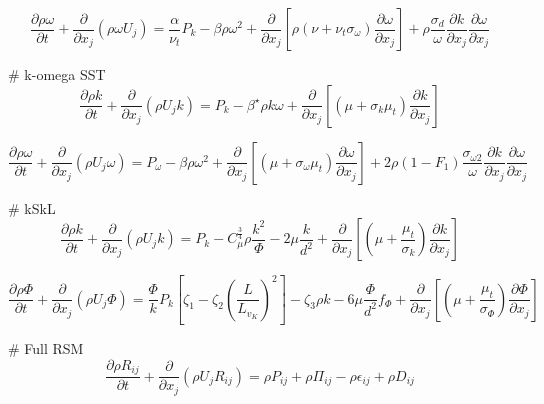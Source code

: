 \begin{equation}
\frac{\partial \rho \omega}{\partial t} + \frac{\partial}{\partial x_j} \left(\rho \omega U_j \right) = \frac{\alpha}{\nu_t}P_k - \beta\rho\omega^2 + \frac{\partial }{\partial x_j}  \left[  \rho\left( \nu + \nu_t\sigma_\omega \right) \frac{\partial \omega}{\partial x_j} \right]  + \rho\frac{\sigma_{d}}{\omega} \frac{\partial k}{\partial x_j}\frac{\partial \omega}{\partial x_j}
\end{equation}

# k-omega SST
\begin{equation}
\frac{\partial \rho k}{\partial t} + \frac{\partial}{\partial x_{j}}\left(\rho U_{j}k \right) = P_{k}-\beta^{\star} \rho k \omega+\frac{\partial}{\partial x_{j}}\left[\left(\mu + \sigma_{k}\mu_{t}\right)\frac{\partial k}{\partial x_{j}}\right]
\end{equation}

\begin{equation}
\frac{\partial \rho \omega}{\partial t} + \frac{\partial}{\partial x_{j}}\left(\rho U_{j}\omega \right) = P_{\omega}-\beta \rho \omega^{2} + \frac{\partial}{\partial x_{j}}\left[\left(\mu + \sigma_{\omega}\mu_{t}\right)\frac{\partial \omega}{\partial x_{j}}\right] + 2 \rho \left(1-F_1\right) \frac{\sigma_{\omega 2}}{\omega} \frac{\partial k}{\partial x_{j}}\frac{\partial \omega}{\partial x_{j}}
\end{equation}

# kSkL
\begin{equation}
\frac{\partial \rho k}{\partial t}+\frac{\partial}{\partial x_{j}}(\rho U_{j}k) = P_{k}-C_{\mu}^{\frac{3}{4}}\rho \frac{k^{2}}{\Phi} - 2 \mu \frac{k}{d^2} + \frac{\partial}{\partial x_{j}} \left[\left(\mu+\frac{\mu_{t}}{\sigma_{k}}\right)\frac{\partial k}{\partial x_{j}}\right]
\end{equation}

\begin{equation}
\frac{\partial \rho \Phi}{\partial t}+\frac{\partial}{\partial x_{j}}\left(\rho U_{j}\Phi\right) = \frac{\Phi}{k}P_{k}\left[\zeta_{1}-\zeta_{2}\left(\frac{L}{L_{v_K}}\right)^{2}\right]-\zeta_{3}\rho k - 6 \mu \frac{\Phi}{d^2}f_{\Phi}+\frac{\partial}{\partial x_{j}}\left[\left(\mu+\frac{\mu_{t}}{\sigma_{\Phi}}\right)\frac{\partial \Phi}{\partial x_{j}}\right]
\end{equation}

# Full RSM
\begin{equation}
\frac{\partial \rho R_{ij}}{\partial t}+\frac{\partial}{\partial x_{j}}\left(\rho U_{j} R_{ij} \right) = \rho P_{ij} + \rho \Pi_{ij} - \rho \epsilon_{ij} + \rho D_{ij}
\end{equation}

